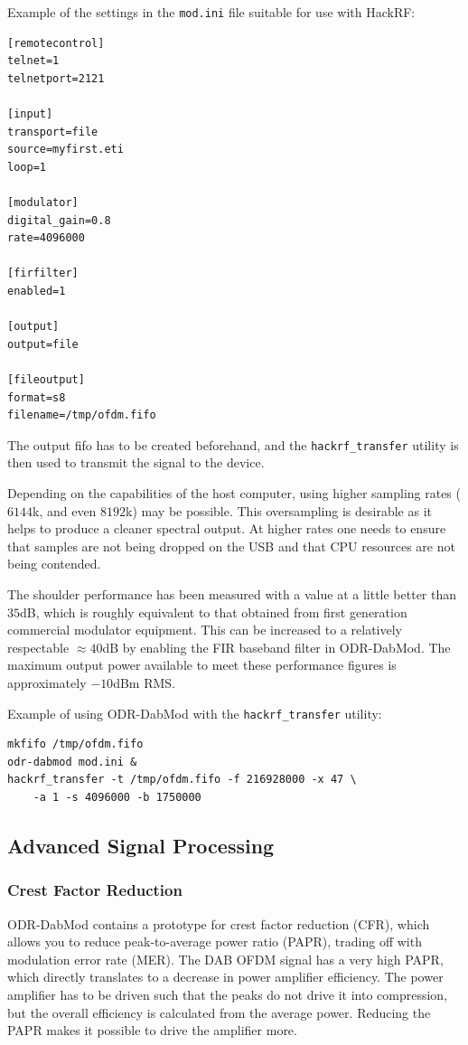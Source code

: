 Example of the settings in the \texttt{mod.ini} file suitable for use with HackRF:

\begin{lstlisting}
[remotecontrol]
telnet=1
telnetport=2121

[input]
transport=file
source=myfirst.eti
loop=1

[modulator]
digital_gain=0.8
rate=4096000

[firfilter]
enabled=1

[output]
output=file

[fileoutput]
format=s8
filename=/tmp/ofdm.fifo

\end{lstlisting}

The output fifo has to be created beforehand, and the \texttt{hackrf\_transfer}
utility is then used to transmit the signal to the device.

Depending on the capabilities of the host computer, using higher sampling rates
($6144$k, and even $8192$k) may be possible. This oversampling is desirable as
it helps to produce a cleaner spectral output. At higher rates one needs to
ensure that samples are not being dropped on the USB and that CPU resources are
not being contended.

The shoulder performance has been measured with a value at a little
better than $35$dB, which is roughly equivalent to that obtained from first
generation commercial modulator equipment. This can be increased to a relatively
respectable $\approx 40$dB by enabling the FIR baseband filter in ODR-DabMod.
The maximum output power available to meet these performance figures is
approximately $-10$dBm RMS.

Example of using ODR-DabMod with the \texttt{hackrf\_transfer} utility:

\begin{lstlisting}
mkfifo /tmp/ofdm.fifo
odr-dabmod mod.ini &
hackrf_transfer -t /tmp/ofdm.fifo -f 216928000 -x 47 \
    -a 1 -s 4096000 -b 1750000
\end{lstlisting}


\subsection{Advanced Signal Processing}
\subsubsection{Crest Factor Reduction}
ODR-DabMod contains a prototype for crest factor reduction (CFR), which allows you to
reduce peak-to-average power ratio (PAPR), trading off with modulation error
rate (MER). The DAB OFDM signal has a very high PAPR, which directly translates
to a decrease in power amplifier efficiency. The power amplifier has to be
driven such that the peaks do not drive it into compression, but the overall
efficiency is calculated from the average power.
Reducing the PAPR makes it possible to drive the amplifier more.

